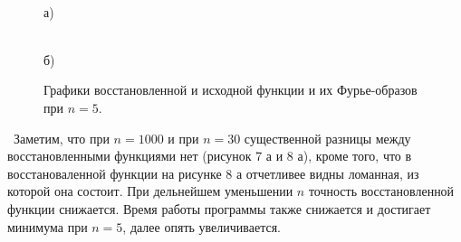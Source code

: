 \documentclass[a5paper, 10pt]{article}
\theoremstyle{definition}
\theoremstyle{plain}
\theoremstyle{remark}
\begin{document}
\begin{figure}[h!]
\begin{minipage}[h!]{0.5\linewidth}
 \\а)
\end{minipage}
\hfill
\begin{minipage}[h!]{0.5\linewidth}
 \\б)
\end{minipage}
\caption{ Графики восстановленной и исходной функции и их Фурье-образов при $n=5$.}
\end{figure}


\newpage
\,
\newpage
Заметим, что при $n=1000$ и при $n=30$ существенной разницы между восстановленными функциями нет (рисунок 7 а и 8 а), кроме того, что в восстановаленной функции на рисунке 8 а отчетливее видны ломанная, из которой она состоит. При дельнейшем уменьшении $n$ точность восстановленной функции снижается. Время работы программы также снижается и достигает минимума при $n=5$, далее опять увеличивается.\\
\end{document}
